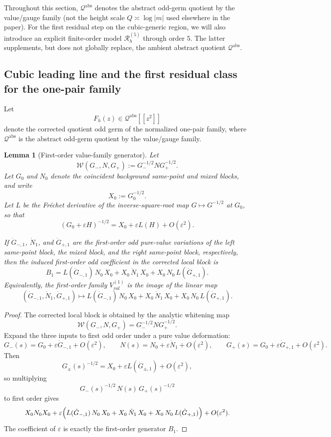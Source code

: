 \documentclass[11pt,a4paper]{amsart}
\def\val{val}%
\theoremstyle{plain}
\newtheorem{lemma}[theorem]{Lemma}
\theoremstyle{definition}
\newcommand{\val}{\mathrm{val}}
\newcommand{\Qabs}{\mathcal Q^{\mathrm{abs}}}
\begin{document}
Throughout this section, $\Qabs$ denotes the abstract odd-germ quotient by
the value/gauge family (not the height scale $Q\asymp\log|m|$ used
elsewhere in the paper). For the first residual step on the cubic-generic
region, we will also introduce an explicit finite-order model
$\mathcal R_h^{(5)}$ through order $5$. The latter supplements, but does
not globally replace, the ambient abstract quotient $\Qabs$.

\subsection{Cubic leading line and the first residual class for the one-pair family}

Let
\[
F_h(z)\in \Qabs[[z^2]]
\]
denote the corrected quotient odd germ of the normalized one-pair family, where
$\Qabs$ is the abstract odd-germ quotient by the value/gauge family.

\begin{lemma}[First-order value-family generator]
\label{lem:first-order-value-family-generator}
Let
\[
\mathcal W(G_-,N,G_+):=G_-^{-1/2}NG_+^{-1/2}.
\]
Let $G_0$ and $N_0$ denote the coincident background same-point and mixed
blocks, and write
\[
X_0:=G_0^{-1/2}.
\]
Let $L$ be the Fr\'echet derivative of the inverse-square-root map
$G\mapsto G^{-1/2}$ at $G_0$, so that
\[
(G_0+\varepsilon H)^{-1/2}
=
X_0+\varepsilon L(H)+O(\varepsilon^2).
\]

If $\dot G_{-,1}$, $\dot N_1$, and $\dot G_{+,1}$ are the first-order
odd pure-value variations of the left same-point block, the mixed block, and
the right same-point block, respectively, then the induced first-order odd
coefficient in the corrected local block is
\[
B_1
=
L(\dot G_{-,1})\,N_0\,X_0
+
X_0\,\dot N_1\,X_0
+
X_0\,N_0\,L(\dot G_{+,1}).
\]
Equivalently, the first-order family $V_{\val}^{(1)}$ is the image of the
linear map
\[
(\dot G_{-,1},\dot N_1,\dot G_{+,1})
\longmapsto
L(\dot G_{-,1})\,N_0\,X_0
+
X_0\,\dot N_1\,X_0
+
X_0\,N_0\,L(\dot G_{+,1}).
\]
\end{lemma}

\begin{proof}
The corrected local block is obtained by the analytic whitening map
\[
\mathcal W(G_-,N,G_+)=G_-^{-1/2}NG_+^{-1/2}.
\]
Expand the three inputs to first odd order under a pure value deformation:
\[
G_-(s)=G_0+\varepsilon \dot G_{-,1}+O(\varepsilon^2),\qquad
N(s)=N_0+\varepsilon \dot N_1+O(\varepsilon^2),\qquad
G_+(s)=G_0+\varepsilon \dot G_{+,1}+O(\varepsilon^2).
\]
Then
\[
G_\pm(s)^{-1/2}
=
X_0+\varepsilon L(\dot G_{\pm,1})+O(\varepsilon^2),
\]
so multiplying
\[
G_-(s)^{-1/2}\,N(s)\,G_+(s)^{-1/2}
\]
to first order gives
\[
X_0N_0X_0
+
\varepsilon\Bigl(
L(\dot G_{-,1})\,N_0\,X_0
+
X_0\,\dot N_1\,X_0
+
X_0\,N_0\,L(\dot G_{+,1})
\Bigr)
+
O(\varepsilon^2).
\]
The coefficient of $\varepsilon$ is exactly the first-order generator
$B_1$.
\end{proof}
\end{document}
